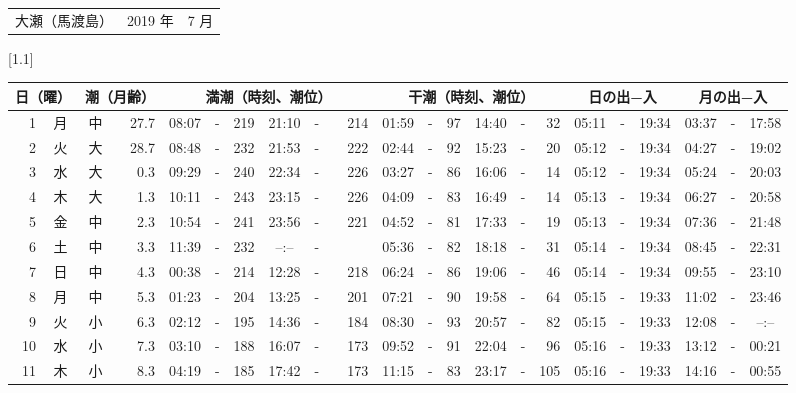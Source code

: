 \documentclass[12pt,a4j]{jsarticle}
\begin{document}
\pagestyle{empty}
 \begin{table}[htbp]
 \begin{center}
 \begin{tabular}{lcc}
 \LARGE{大瀬（馬渡島）}  & \large{2019 年} & \large{ 7 月} \\
 \end{tabular}
 \end{center}
 \begin{center}
         \scalebox{0.7}[1.1]{
         \begin{tabular}{|rc|cr|ccrccr|ccrccr|ccc|ccc|}
    \hline
    \multicolumn{2}{|c|}{日（曜）} & \multicolumn{2}{c|}{潮（月齢）} & \multicolumn{6}{c|}{満潮（時刻、潮位）} & \multicolumn{6}{c|}{干潮（時刻、潮位）} & \multicolumn{3}{c|}{日の出−入} &  \multicolumn{3}{c|}{月の出−入}\\
 \hline
 1 & 月 & 中 & 27.7 &  08:07 &-&219 &  21:10 &-& 214 &  01:59 &-& \hfill97 &  14:40 &-&\hfill32 & 05:11 & -& 19:34 & 03:37 & -& 17:58 \\
 2 & 火 & 大 & 28.7 &  08:48 &-& 232 &  21:53 &-& 222 &  02:44 &-&  92 &  15:23 &-&  20 & 05:12 & -& 19:34 & 04:27 & -& 19:02 \\
 3 & 水 & 大 &  0.3 &  09:29 &-& 240 &  22:34 &-& 226 &  03:27 &-&  86 &  16:06 &-&  14 & 05:12 & -& 19:34 & 05:24 & -& 20:03 \\
 4 & 木 & 大 &  1.3 &  10:11 &-& 243 &  23:15 &-& 226 &  04:09 &-&  83 &  16:49 &-&  14 & 05:13 & -& 19:34 & 06:27 & -& 20:58 \\
 5 & 金 & 中 &  2.3 &  10:54 &-& 241 &  23:56 &-& 221 &  04:52 &-&  81 &  17:33 &-&  19 & 05:13 & -& 19:34 & 07:36 & -& 21:48 \\
 6 & 土 & 中 &  3.3 &  11:39 &-& 232 &  --:-- &-&~~~~~ &  05:36 &-&  82 &  18:18 &-&  31 & 05:14 & -& 19:34 & 08:45 & -& 22:31 \\
 7 & 日 & 中 &  4.3 &  00:38 &-& 214 &  12:28 &-& 218 &  06:24 &-&  86 &  19:06 &-&  46 & 05:14 & -& 19:34 & 09:55 & -& 23:10 \\
 8 & 月 & 中 &  5.3 &  01:23 &-& 204 &  13:25 &-& 201 &  07:21 &-&  90 &  19:58 &-&  64 & 05:15 & -& 19:33 & 11:02 & -& 23:46 \\
 9 & 火 & 小 &  6.3 &  02:12 &-& 195 &  14:36 &-& 184 &  08:30 &-&  93 &  20:57 &-&  82 & 05:15 & -& 19:33 & 12:08 & -& --:-- \\
10 & 水 & 小 &  7.3 &  03:10 &-& 188 &  16:07 &-& 173 &  09:52 &-&  91 &  22:04 &-&  96 & 05:16 & -& 19:33 & 13:12 & -& 00:21 \\
11 & 木 & 小 &  8.3 &  04:19 &-& 185 &  17:42 &-& 173 &  11:15 &-&  83 &  23:17 &-& 105 & 05:16 & -& 19:33 & 14:16 & -& 00:55 \\

\end{tabular}}
\end{center}
\end{table}
\end{document}
